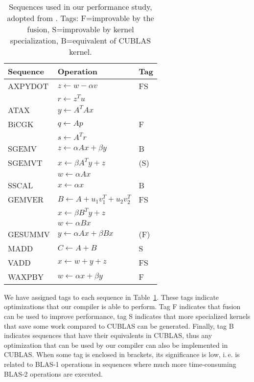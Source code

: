 \documentclass[final]{siamltex}
\def\ie{i.\,e.}
\begin{document}
{\begin{table}
	\centering
	\small
	\begin{tabular}{|l|l|l|}
		\hline
		Sequence & Operation & Tag \\
		\hline
		AXPYDOT & $z \leftarrow w - \alpha v$ & FS \\ 
		& $r \leftarrow z^T u$ & \\
		ATAX & $ y \leftarrow A^T A x$ & \\
		BiCGK & $q \leftarrow A p$ & F \\
		& $s \leftarrow A^T r$ & \\
		SGEMV & $z \leftarrow \alpha A x + \beta y$ & B \\ 
		SGEMVT & $x \leftarrow \beta A^T y + z$ & (S) \\
		& $w \leftarrow \alpha A x$ & \\
		SSCAL & $x \leftarrow \alpha x$ & B \\
		GEMVER & $B \leftarrow A + u_1 v_1^T + u_2 v_2^T$ & FS \\
		& $x \leftarrow \beta B^T y + z$ & \\
		& $w \leftarrow \alpha B x$ & \\
		GESUMMV & $y \leftarrow \alpha A x + \beta B x$ & (F) \\
		MADD & $C \leftarrow A + B$ & S \\
		VADD & $x \leftarrow w + y + z$ & FS \\
		WAXPBY & $w \leftarrow \alpha x + \beta y$ & F \\
		\hline
	\end{tabular}
	\caption{Sequences used in our performance study, adopted from \cite{belter2009automating}. Tags: F=improvable by the fusion, S=improvable by kernel specialization, B=equivalent of CUBLAS kernel.}
	\label{tab:kernels}
\end{table}

We have assigned tags to each sequence in Table~\ref{tab:kernels}. These tags indicate optimizations that our compiler is able to perform. Tag F indicates that fusion can be used to improve performance, tag S indicates that more specialized kernels that save some work compared to CUBLAS can be generated. Finally, tag B indicates sequences that have their equivalents in CUBLAS, thus any optimization that can be used by our compiler can also be implemented in CUBLAS. When some tag is enclosed in brackets, its significance is low, \ie{} is related to BLAS-1 operations in sequences where much more time-consuming BLAS-2 operations are executed.

}
\end{document}
